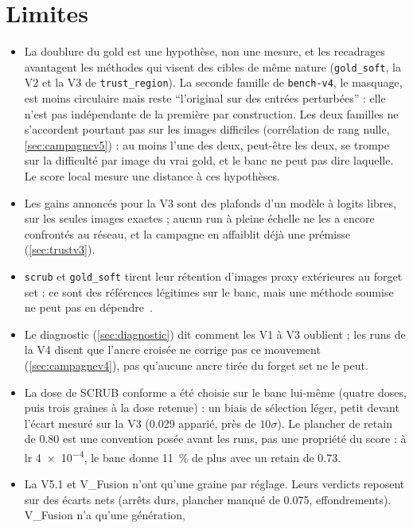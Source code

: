 \documentclass[11pt,a4paper]{article}
\newcommand{\code}[1]{\texttt{#1}}
\begin{document}
\section{Limites}\label{sec:limites}
\begin{itemize}[leftmargin=1.2em]
  \item La doublure du gold est une hypothèse, non une mesure, et les recadrages avantagent les
    méthodes qui visent des cibles de même nature (\code{gold\_soft}, la V2 et la V3 de
    \code{trust\_region}). La seconde famille de \code{bench-v4}, le masquage, est moins circulaire
    mais reste \enquote{l'original sur des entrées perturbées} : elle n'est pas indépendante de la
    première par construction. Les deux familles ne s'accordent pourtant pas sur les images
    difficiles (corrélation de rang nulle, \cref{sec:campagnev5}) : au moins l'une des deux, peut-être
    les deux, se trompe sur la difficulté par image du vrai gold, et le banc ne peut pas dire laquelle.
    Le score local mesure une distance à ces hypothèses.
  \item Les gains annoncés pour la V3 sont des plafonds d'un modèle à logits libres, sur les
    seules images exactes ; aucun run à pleine échelle ne les a encore confrontés au réseau, et la
    campagne en affaiblit déjà une prémisse (\cref{sec:trustv3}).
  \item \code{scrub} et \code{gold\_soft} tirent leur rétention d'images proxy extérieures au forget
    set : ce sont des références légitimes sur le banc, mais une méthode soumise ne peut pas en
    dépendre~\cite{sujet2026}.
  \item Le diagnostic (\cref{sec:diagnostic}) dit comment les V1 à V3 oublient ; les runs de la V4
    disent que l'ancre croisée ne corrige pas ce mouvement (\cref{sec:campagnev4}), pas qu'aucune
    ancre tirée du forget set ne le peut.
  \item La dose de SCRUB conforme a été choisie sur le banc lui-même (quatre doses, puis trois graines
    à la dose retenue) : un biais de sélection léger, petit devant l'écart mesuré sur la V3
    (\num{+0.029} apparié, près de $10\sigma$). Le plancher de retain de \num{0.80} est une convention
    posée avant les runs, pas une propriété du score : à lr \num{4e-4}, le banc donne \SI{11}{\percent}
    de plus avec un retain de \num{0.73}.
  \item La V5.1 et V\_Fusion n'ont qu'une graine par réglage. Leurs verdicts reposent sur des écarts
    nets (arrêts durs, plancher manqué de \num{0.075}, effondrements). V\_Fusion n'a qu'une génération,

\end{itemize}
\end{document}
